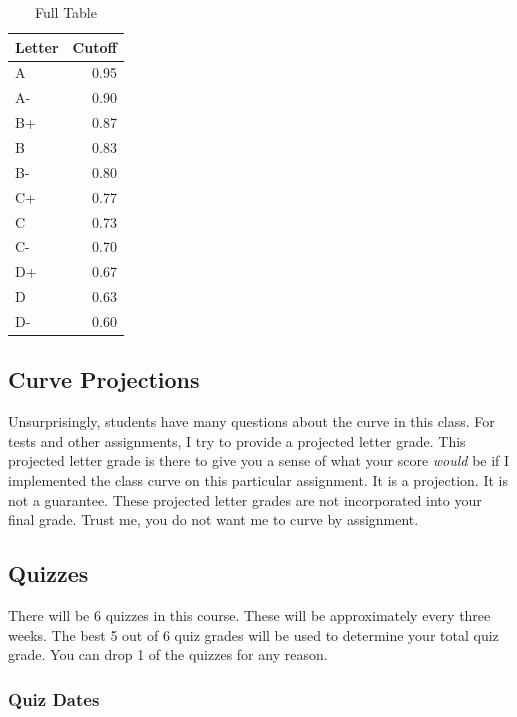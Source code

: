 \documentclass[
]{book}
\begin{document}
\begin{table}

\caption{\label{tab:unnamed-chunk-3}Full Table}
\centering
\begin{tabular}[t]{l|r}
\hline
Letter & Cutoff\\
\hline
A & 0.95\\
\hline
A- & 0.90\\
\hline
B+ & 0.87\\
\hline
B & 0.83\\
\hline
B- & 0.80\\
\hline
C+ & 0.77\\
\hline
C & 0.73\\
\hline
C- & 0.70\\
\hline
D+ & 0.67\\
\hline
D & 0.63\\
\hline
D- & 0.60\\
\hline
\end{tabular}
\end{table}

\hypertarget{curve-projections-1}{%
\subsection{Curve Projections}\label{curve-projections-1}}

Unsurprisingly, students have many questions about the curve in this class. For tests and other assignments, I try to provide a projected letter grade.
This projected letter grade is there to give you a sense of what your score \emph{would} be if I implemented the class curve on this particular assignment.
It is a projection. It is not a guarantee. These projected letter grades are not incorporated into your final grade.
Trust me, you do not want me to curve by assignment.

\hypertarget{quizzes-1}{%
\subsection{Quizzes}\label{quizzes-1}}

There will be 6 quizzes in this course. These will be approximately every three weeks. The best 5 out of 6 quiz grades will be used to determine your total quiz grade. You can drop 1 of the quizzes for any reason.

\hypertarget{quiz-dates-1}{%
\subsubsection{Quiz Dates}\label{quiz-dates-1}}
\end{document}
